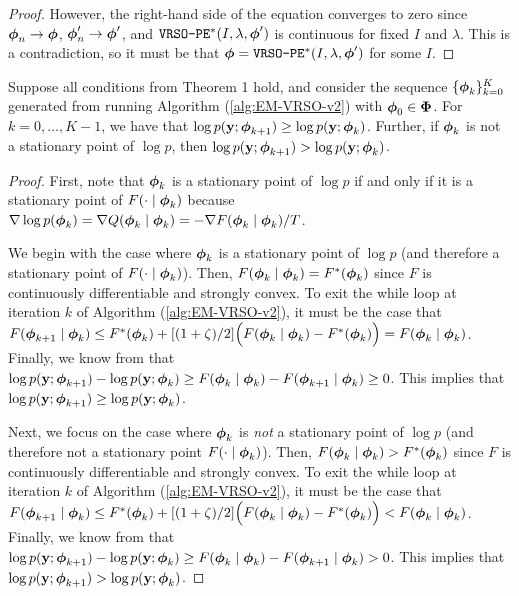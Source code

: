 \begin{proof}
    However, the right-hand side of the equation converges to zero since $\boldsymbol{\phi}_n \to \boldsymbol{\phi}$, $\boldsymbol{\phi}'_n \to \boldsymbol{\phi}'$, and $\texttt{VRSO-PE}^*(I,\lambda,\boldsymbol{\phi}')$ is continuous for fixed $I$ and $\lambda$. This is a contradiction, so it must be that $\boldsymbol{\phi} = \texttt{VRSO-PE}^*(I,\lambda,\boldsymbol{\phi}')$ for some $I$.
\end{proof}

\begin{lemma}
    Suppose all conditions from Theorem 1 hold, and consider the sequence $\{\boldsymbol{\phi}_k\}_{k=0}^{K}$ generated from running Algorithm (\ref{alg:EM-VRSO-v2}) with $\boldsymbol{\phi}_0 \in \boldsymbol{\Phi}$. For $k = 0,\ldots,K-1$, we have that $\log p(\mathbf{y};\boldsymbol{\phi}_{k+1}) \geq \log p(\mathbf{y};\boldsymbol{\phi}_k)$. Further, if $\boldsymbol{\phi}_k$ is not a stationary point of $\log p$, then $\log p(\mathbf{y};\boldsymbol{\phi}_{k+1}) > \log p(\mathbf{y};\boldsymbol{\phi}_k)$.
\end{lemma}

\begin{proof}

First, note that $\boldsymbol{\phi}_k$ is a stationary point of $\log p$ if and only if it is a stationary point of $F(\cdot \mid \boldsymbol{\phi}_k)$ because $\nabla \log p(\boldsymbol{\phi}_k) = \nabla Q(\boldsymbol{\phi}_k \mid \boldsymbol{\phi}_k) = -\nabla F(\boldsymbol{\phi}_k \mid \boldsymbol{\phi}_k) / T$.

We begin with the case where $\boldsymbol{\phi}_k$ is a stationary point of $\log p$ (and therefore a stationary point of $F(\cdot \mid \boldsymbol{\phi}_k)$). Then, $F(\boldsymbol{\phi}_k \mid \boldsymbol{\phi}_k) = F^{*}(\boldsymbol{\phi}_{k})$ since $F$ is continuously differentiable and strongly convex. To exit the while loop at iteration $k$ of Algorithm (\ref{alg:EM-VRSO-v2}), it must be the case that $F(\boldsymbol{\phi}_{k+1} \mid \boldsymbol{\phi}_{k}) \leq F^*(\boldsymbol{\phi}_{k}) + [(1+\zeta)/2] \Big(F(\boldsymbol{\phi}_{k} \mid \boldsymbol{\phi}_{k}) - F^*(\boldsymbol{\phi}_{k}) \Big) = F(\boldsymbol{\phi}_k \mid \boldsymbol{\phi}_k)$. Finally, we know from \citet{Dempster:1977} that $\log p(\mathbf{y} ; \boldsymbol{\phi}_{k+1}) - \log p(\mathbf{y} ; \boldsymbol{\phi}_{k}) \geq F(\boldsymbol{\phi}_{k} \mid \boldsymbol{\phi}_{k}) - F(\boldsymbol{\phi}_{k+1} \mid \boldsymbol{\phi}_{k}) \geq 0$. This implies that $\log p(\mathbf{y} ; \boldsymbol{\phi}_{k+1}) \geq \log p(\mathbf{y} ; \boldsymbol{\phi}_{k})$.

Next, we focus on the case where $\boldsymbol{\phi}_k$ is \textit{not} a stationary point of $\log p$ (and therefore not a stationary point $F(\cdot \mid \boldsymbol{\phi}_k)$). Then, $F(\boldsymbol{\phi}_k \mid \boldsymbol{\phi}_k) > F^{*}(\boldsymbol{\phi}_{k})$ since $F$ is continuously differentiable and strongly convex. To exit the while loop at iteration $k$ of Algorithm (\ref{alg:EM-VRSO-v2}), it must be the case that $F(\boldsymbol{\phi}_{k+1} \mid \boldsymbol{\phi}_{k}) \leq F^*(\boldsymbol{\phi}_{k}) + [(1+\zeta)/2] \Big(F(\boldsymbol{\phi}_{k} \mid \boldsymbol{\phi}_{k}) - F^*(\boldsymbol{\phi}_{k}) \Big) < F(\boldsymbol{\phi}_k \mid \boldsymbol{\phi}_k)$. Finally, we know from \citet{Dempster:1977} that $\log p(\mathbf{y} ; \boldsymbol{\phi}_{k+1}) - \log p(\mathbf{y} ; \boldsymbol{\phi}_{k}) \geq F(\boldsymbol{\phi}_{k} \mid \boldsymbol{\phi}_{k}) - F(\boldsymbol{\phi}_{k+1} \mid \boldsymbol{\phi}_{k}) > 0$. This implies that $\log p(\mathbf{y} ; \boldsymbol{\phi}_{k+1}) > \log p(\mathbf{y} ; \boldsymbol{\phi}_{k})$.
\end{proof}

